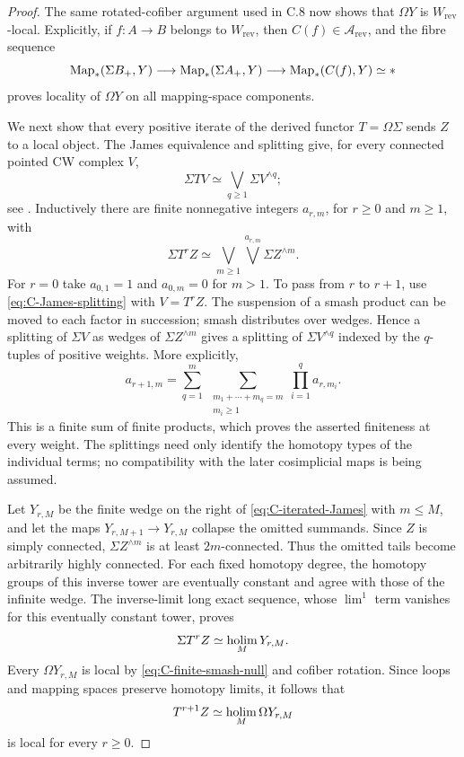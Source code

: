 \begin{proof}
The same rotated-cofiber argument used in C.8 now shows that $\Omega Y$ is $W_{\mathrm{rev}}$-local. Explicitly, if $f:A\to B$ belongs to $W_{\mathrm{rev}}$, then $C(f)\in\mathcal A_{\mathrm{rev}}$, and the fibre sequence
\[
 \operatorname{Map}_*(\Sigma B_+,Y)\longrightarrow
 \operatorname{Map}_*(\Sigma A_+,Y)\longrightarrow
 \operatorname{Map}_*(C(f),Y)\simeq *
\]
proves locality of $\Omega Y$ on all mapping-space components.

We next show that every positive iterate of the derived functor $T=\Omega\Sigma$ sends $Z$ to a local object. The James equivalence and splitting give, for every connected pointed CW complex $V$,
\begin{equation}\label{eq:C-James-splitting}
 \Sigma T V\simeq
 \bigvee_{q\geq1}\Sigma V^{\wedge q};
\end{equation}
see \cite[Proposition 4I.2 and Theorem 4J.1]{FGHHatcher2002}.
Inductively there are finite nonnegative integers $a_{r,m}$, for $r\geq0$ and $m\geq1$, with
\begin{equation}\label{eq:C-iterated-James}
 \Sigma T^r Z\simeq
 \bigvee_{m\geq1}\bigvee^{a_{r,m}}\Sigma Z^{\wedge m}.
\end{equation}
For $r=0$ take $a_{0,1}=1$ and $a_{0,m}=0$ for $m>1$. To pass from $r$ to $r+1$, use \eqref{eq:C-James-splitting} with $V=T^rZ$. The suspension of a smash product can be moved to each factor in succession; smash distributes over wedges. Hence a splitting of $\Sigma V$ as wedges of $\Sigma Z^{\wedge m}$ gives a splitting of $\Sigma V^{\wedge q}$ indexed by the $q$-tuples of positive weights. More explicitly,
\[
 a_{r+1,m}=
 \sum_{q=1}^m\ \sum_{\substack{m_1+\cdots+m_q=m\\m_i\geq1}}
          \prod_{i=1}^q a_{r,m_i}.
\]
This is a finite sum of finite products, which proves the asserted finiteness at every weight. The splittings need only identify the homotopy types of the individual terms; no compatibility with the later cosimplicial maps is being assumed.

Let $Y_{r,M}$ be the finite wedge on the right of \eqref{eq:C-iterated-James} with $m\leq M$, and let the maps $Y_{r,M+1}\to Y_{r,M}$ collapse the omitted summands. Since $Z$ is simply connected, $\Sigma Z^{\wedge m}$ is at least $2m$-connected. Thus the omitted tails become arbitrarily highly connected. For each fixed homotopy degree, the homotopy groups of this inverse tower are eventually constant and agree with those of the infinite wedge. The inverse-limit long exact sequence, whose $\lim^1$ term vanishes for this eventually constant tower, proves
\[
 \Sigma T^r Z\simeq\operatorname*{holim}_M Y_{r,M}.
\]
Every $\Omega Y_{r,M}$ is local by \eqref{eq:C-finite-smash-null} and cofiber rotation. Since loops and mapping spaces preserve homotopy limits, it follows that
\[
 T^{r+1}Z\simeq\operatorname*{holim}_M\Omega Y_{r,M}
\]
is local for every $r\geq0$.


\end{proof}
